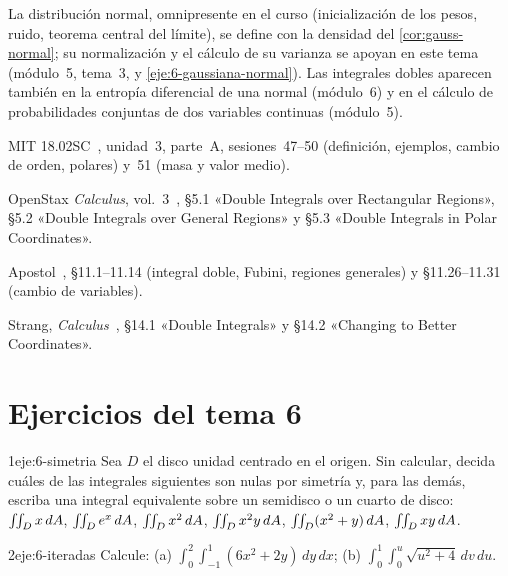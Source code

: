 \begin{observacion}
La distribución normal, omnipresente en el curso (inicialización de los pesos, ruido, teorema central del límite), se define con la densidad del \cref{cor:gauss-normal}; su normalización y el cálculo de su varianza se apoyan en este tema (módulo~5, tema~3, y \cref{eje:6-gaussiana-normal}). Las integrales dobles aparecen también en la entropía diferencial de una normal (módulo~6) y en el cálculo de probabilidades conjuntas de dos variables continuas (módulo~5).
\end{observacion}

\begin{lecturas}
\item MIT 18.02SC~\cite{mit1802}, unidad~3, parte~A, sesiones~47--50 (definición, ejemplos, cambio de orden, polares) y~51 (masa y valor medio).
\item OpenStax \emph{Calculus}, vol.~3~\cite{openstax3}, §5.1 «Double Integrals over Rectangular Regions», §5.2 «Double Integrals over General Regions» y §5.3 «Double Integrals in Polar Coordinates».
\item Apostol~\cite{apostol2}, §11.1--11.14 (integral doble, Fubini, regiones generales) y §11.26--11.31 (cambio de variables).
\item Strang, \emph{Calculus}~\cite{strangcalc}, §14.1 «Double Integrals» y §14.2 «Changing to Better Coordinates».
\end{lecturas}

\section*{Ejercicios del tema 6}

\begin{ejercicio}{1}{eje:6-simetria}
Sea $D$ el disco unidad centrado en el origen. Sin calcular, decida cuáles de las integrales siguientes son nulas por simetría y, para las demás, escriba una integral equivalente sobre un semidisco o un cuarto de disco: $\iint_Dx\,dA$, $\iint_De^x\,dA$, $\iint_Dx^2\,dA$, $\iint_Dx^2y\,dA$, $\iint_D(x^2+y)\,dA$, $\iint_Dxy\,dA$.
\end{ejercicio}

\begin{ejercicio}{2}{eje:6-iteradas}
Calcule: (a) $\displaystyle\int_0^2\int_{-1}^{1}(6x^2+2y)\,dy\,dx$; (b) $\displaystyle\int_0^1\int_0^{u}\sqrt{u^2+4}\,dv\,du$.
\end{ejercicio}

